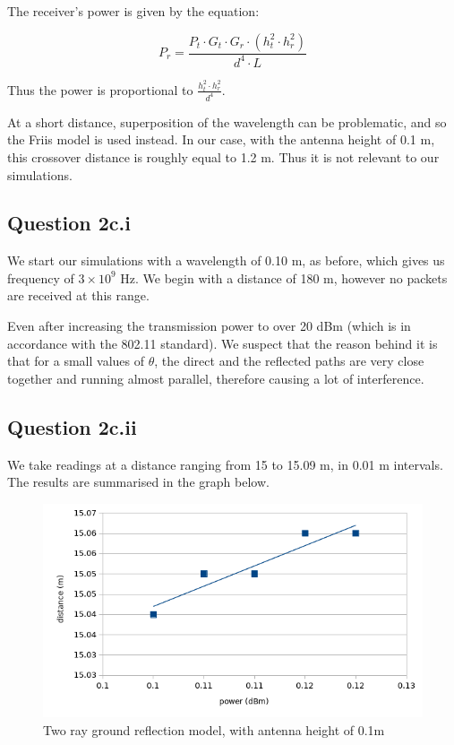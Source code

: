 \documentclass[11pt,journal]{article}
\begin{document}
	The receiver's power is given by the equation:
	
	\[P_r = \dfrac{P_t\cdot G_t \cdot G_r\cdot (h_t^2 \cdot h_r^2)}{d^4 \cdot L}\]
	
	Thus the power is proportional to $\frac{h_t^2 \cdot h_r^2}{d^4}$.
	
	At a short distance, superposition of the wavelength can be problematic, and so the Friis model is used instead. In our case, with the antenna height of 0.1 m, this crossover distance is roughly equal to 1.2 m. Thus it is not relevant to our simulations.
	
	\subsection{Question 2c.i}
	We start our simulations with a wavelength of 0.10 m, as before, which gives us frequency of $3 \times 10^9$ Hz. We begin with a distance of 180 m, however no packets are received at this range. 
	
	Even after increasing the transmission power to over 20 dBm (which is in accordance with the 802.11 standard). We suspect that the reason behind it is that for a small values of $\theta$, the direct and the reflected paths are very close together and running almost parallel, therefore causing a lot of interference.
	
	\subsection{Question 2c.ii}
	We take readings at a distance ranging from 15 to 15.09 m, in 0.01 m intervals. The results are summarised in the graph below.
	
	\begin{figure}[h]
		\centering
		\includegraphics[scale=0.6]{graph_2ray1.png}
		\caption{Two ray ground reflection model, with antenna height of 0.1m}
	\end{figure}
\end{document}

